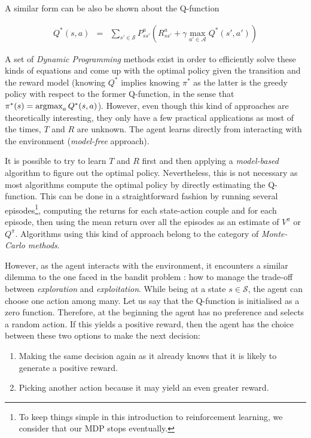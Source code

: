         A similar form can be also be shown about the Q-function
								
					\begin{eqnarray}
						Q^*(s,a) & = & \sum_{s' \in \mathcal{S}} P_{ss'}^a (R_{ss'}^a + \gamma \max_{a' \in \mathcal{A}} Q^*(s',a')) \label{eq:qbellmanoptim}
					\end{eqnarray}

        A set of \textit{Dynamic Programming} methods exist in order to efficiently solve these kinds of equations and come up with the optimal policy given the transition and the reward model (knowing $Q^*$ implies knowing $\pi^*$ as the latter is the greedy policy with respect to the former Q-function, in the sense that $\pi^*(s) = \mathop{\hbox{argmax}}_a Q^*(s,a)$). However, even though this kind of approaches are theoretically interesting, they only have a few practical applications as most of the times, $T$ and $R$ are unknown. The agent learns directly from interacting with the environment (\textit{model-free} approach).
				
				It is possible to try to learn $T$ and $R$ first and then applying a \textit{model-based} algorithm to figure out the optimal policy. Nevertheless, this is not necessary as most algorithms compute the optimal policy by directly estimating the Q-function. This can be done in a straightforward fashion by running several episodes\footnote{To keep things simple in this introduction to reinforcement learning, we consider that our MDP stops eventually.}, computing the returns for each state-action couple and for each episode, then using the mean return over all the episodes as an estimate of $V^\pi$ or $Q^\pi$. Algorithms using this kind of approach belong to the category of \textit{Monte-Carlo methods}.
				
				However, as the agent interacts with the environment, it encounters a similar dilemma to the one faced in the bandit problem \cite{Berry1985}: how to manage the trade-off between \textit{exploration} and \textit{exploitation}. While being at a state $s \in \mathcal{S}$, the agent can choose one action among many. Let us say that the Q-function is initialised as a zero function. Therefore, at the beginning the agent has no preference and selects a random action. If this yields a positive reward, then the agent has the choice between these two options to make the next decision:
				
				\begin{enumerate}
					\item Making the same decision again as it already knows that it is likely to generate a positive reward.
					\item Picking another action because it may yield an even greater reward.
				\end{enumerate}
				
